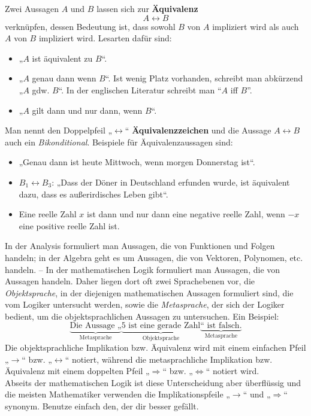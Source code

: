 	\begin{de}[Äquivalenz]
		Zwei Aussagen $A$ und $B$ lassen sich zur \textbf{Äquivalenz}
    \[ A\leftrightarrow B \]
    verknüpfen, dessen Bedeutung ist, dass sowohl $B$ von $A$ impliziert wird als auch $A$ von $B$ impliziert wird. Lesarten dafür sind:
    \begin{itemize}
    \item „$A$ ist äquivalent zu $B$“.
     \item „$A$ genau dann wenn $B$“. Ist wenig Platz vorhanden, schreibt man abkürzend „$A$ gdw. $B$“. In der englischen Literatur schreibt man ``$A$ iff $B$''.
    \item „$A$ gilt dann und nur dann, wenn $B$“.
    \end{itemize}
Man nennt den Doppelpfeil „$\leftrightarrow$“ \textbf{Äquivalenzzeichen} und die Aussage $A\leftrightarrow B$ auch ein \emph{Bikonditional}. Beispiele für Äquivalenzaussagen sind:
\begin{itemize}
     \item „Genau dann ist heute Mittwoch, wenn morgen Donnerstag ist“.
     \item $B_1\leftrightarrow B_3$: „Dass der Döner in Deutschland erfunden wurde, ist äquivalent dazu, dass es außerirdisches Leben gibt“.
     \item Eine reelle Zahl $x$ ist dann und nur dann eine negative reelle Zahl, wenn $-x$ eine positive reelle Zahl ist.
    \end{itemize}
	\end{de}


	
\begin{bem}
 In der Analysis formuliert man Aussagen, die von Funktionen und Folgen handeln; in der Algebra geht es um Aussagen, die von Vektoren, Polynomen, etc. handeln. -- In der mathematischen Logik formuliert man Aussagen, die von Aussagen handeln. Daher liegen dort oft zwei Sprachebenen vor, die \emph{Objektsprache}, in der diejenigen mathematischen Aussagen formuliert sind, die vom Logiker untersucht werden, sowie die \emph{Metasprache}, der sich der Logiker bedient, um die objektsprachlichen Aussagen zu untersuchen. Ein Beispiel:
 \[ \underbrace{\text{Die Aussage „}}_{\text{Metasprache}}\underbrace{\text{$5$ ist eine gerade Zahl}}_{\text{Objektsprache}} \underbrace{\text{“ ist falsch.}}_{\text{Metasprache}} \]
 Die objektsprachliche Implikation bzw. Äquivalenz wird mit einem einfachen Pfeil „$\to$“ bzw. „$\leftrightarrow$“ notiert, während die metasprachliche Implikation bzw. Äquivalenz mit einem doppelten Pfeil „$\Rightarrow$“ bzw. „$\Leftrightarrow$“ notiert wird. \\[0.5em]
 Abseits der mathematischen Logik ist diese Unterscheidung aber überflüssig und die meisten Mathematiker verwenden die Implikationspfeile „$\to$“ und „$\Rightarrow$“ synonym. Benutze einfach den, der dir besser gefällt.
\end{bem}

